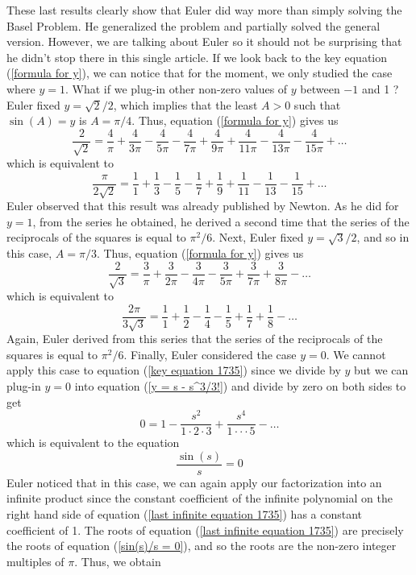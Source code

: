 These last results clearly show that Euler did way more than simply solving the Basel Problem. He generalized the problem and partially solved the general version. However, we are talking about Euler so it should not be surprising that he didn't stop there in this single article. If we look back to the key equation (\ref{formula for y}), we can notice that for the moment, we only studied the case where $y=1$. What if we plug-in other non-zero values of $y$ between $-1$ and 1 ? Euler fixed $y = \sqrt{2}/2$, which implies that the least $A > 0$ such that $\sin(A) = y$ is $A = \pi/4$. Thus, equation (\ref{formula for y}) gives us
$$\frac{2}{\sqrt{2}} = \frac{4}{\pi} + \frac{4}{3\pi} - \frac{4}{5\pi} -\frac{4}{7\pi} + \frac{4}{9\pi} + \frac{4}{11\pi} - \frac{4}{13\pi} - \frac{4}{15\pi} + \dots$$
which is equivalent to
\begin{equation}
    \frac{\pi}{2\sqrt{2}} = \frac{1}{1} + \frac{1}{3} - \frac{1}{5} - \frac{1}{7} + \frac{1}{9} + \frac{1}{11} - \frac{1}{13} - \frac{1}{15} + \dots
\end{equation}
Euler observed that this result was already published by Newton. As he did for $y = 1$, from the series he obtained, he derived a second time that the series of the reciprocals of the squares is equal to $\pi^2/6$. Next, Euler fixed $y = \sqrt{3}/2$, and so in this case, $A = \pi/3$. Thus, equation (\ref{formula for y}) gives us
$$\frac{2}{\sqrt{3}} = \frac{3}{\pi} + \frac{3}{2\pi} - \frac{3}{4\pi} - \frac{3}{5\pi} + \frac{3}{7\pi} + \frac{3}{8\pi} - \dots$$
which is equivalent to
\begin{equation}
    \frac{2\pi}{3\sqrt{3}} = \frac{1}{1} + \frac{1}{2} - \frac{1}{4} - \frac{1}{5} + \frac{1}{7} + \frac{1}{8} - \dots
\end{equation}
Again, Euler derived from this series that the series of the reciprocals of the squares is equal to $\pi^2/6$. Finally, Euler considered the case $y = 0$. We cannot apply this case to equation (\ref{key equation 1735}) since we divide by $y$ but we can plug-in $y = 0$ into equation (\ref{y = s - s^3/3!}) and divide by zero on both sides to get 
\begin{equation} \label{last infinite equation 1735}
    0 = 1 - \frac{s^2}{1\cdot 2 \cdot 3} + \frac{s^4}{1\cdot \cdot \cdot 5} - \dots
\end{equation}
which is equivalent to the equation 
\begin{equation} \label{sin(s)/s = 0}
    \frac{\sin(s)}{s} = 0
\end{equation}
Euler noticed that in this case, we can again apply our factorization into an infinite product since the constant coefficient of the infinite polynomial on the right hand side of equation (\ref{last infinite equation 1735}) has a constant coefficient of 1. The roots of equation (\ref{last infinite equation 1735}) are precisely the roots of equation (\ref{sin(s)/s = 0}), and so the roots are the non-zero integer multiples of $\pi$. Thus, we obtain
